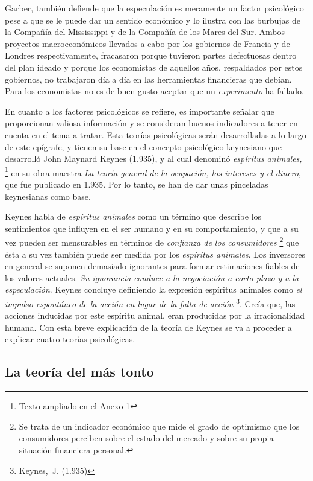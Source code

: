 Garber, también defiende que la especulación es meramente un factor psicológico pese a que se le puede dar un sentido económico y lo ilustra con las burbujas de la Compañía del Mississippi y de la Compañía de los Mares del Sur.  Ambos proyectos macroeconómicos llevados a cabo por los gobiernos de Francia y de Londres respectivamente, fracasaron porque tuvieron partes defectuosas dentro del plan ideado y porque los economistas de aquellos años, respaldados por estos gobiernos, no trabajaron día a día en las herramientas financieras que debían. Para los economistas no es de buen gusto aceptar que un \emph{experimento} ha fallado. 

En cuanto a los factores psicológicos se refiere, es importante señalar que proporcionan valiosa información y se consideran buenos indicadores a tener en cuenta en el tema a tratar. Esta teorías psicológicas serán desarrolladas a lo largo de este epígrafe, y tienen su base en el concepto psicológico keynesiano que desarrolló John Maynard Keynes (1.935), y al cual denominó \emph{espíritus animales,} 	\footnote{Texto ampliado en el Anexo 1} en su obra maestra \emph{La teoría general de la ocupación, los intereses y el dinero}, que fue publicado en 1.935. Por lo tanto, se han de dar unas pinceladas keynesianas como base.

Keynes habla de \emph{espíritus animales} como un término que describe los sentimientos que influyen en el ser humano y en su comportamiento, y que a su vez pueden ser mensurables en términos de \emph{confianza de los consumidores}	\footnote{Se trata de un indicador económico que mide el grado de optimismo que los consumidores perciben sobre el estado del mercado y sobre su propia situación financiera personal.} que ésta a su vez también puede ser medida por los \emph{espíritus animales}. Los inversores en general se suponen demasiado ignorantes para formar estimaciones fiables de los valores actuales. \emph{Su ignorancia conduce a la negociación a corto plazo y a la especulación}. Keynes concluye definiendo la expresión espíritus animales como \emph{el impulso espontáneo de la acción en lugar de la falta de acción} \footnote{Keynes, J. (1.935)}. Creía que, las acciones inducidas por este espíritu animal, eran producidas por la irracionalidad humana.
Con esta breve explicación de la teoría de Keynes se va a proceder a explicar cuatro teorías psicológicas.

\subsection{La teoría del más tonto}

